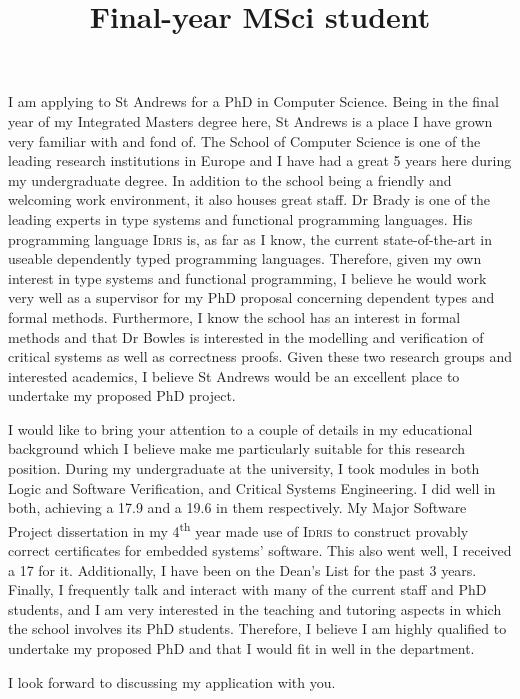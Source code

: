 \documentclass[colorlinks,11pt]{moderncv}
\title{Final-year MSci student}
\date{}
\begin{document}
    
    \vspace*{-1cm}
    
    \makelettertitle
    
    
    I am applying to St Andrews for a PhD in Computer Science. Being in the
    final year of my Integrated Masters degree here, St Andrews is a place I
    have grown very familiar with and fond of. The School of Computer Science is
    one of the leading research institutions in Europe and I have had a great 5
    years here during my undergraduate degree. In addition to the school being a
    friendly and welcoming work environment, it also houses great staff. Dr
    Brady is one of the leading experts in type systems and functional
    programming languages. His programming language \textsc{Idris} is, as far as
    I know, the current state-of-the-art in useable dependently typed
    programming languages. Therefore, given my own interest in type systems and
    functional programming, I believe he would work very well as a supervisor
    for my PhD proposal concerning dependent types and formal methods.
    Furthermore, I know the school has an interest in formal methods and that Dr
    Bowles is interested in the modelling and verification of critical systems
    as well as correctness proofs. Given these two research groups and
    interested academics, I believe St Andrews would be an excellent place to
    undertake my proposed PhD project.
    
    I would like to bring your attention to a couple of details in my
    educational background which I believe make me particularly suitable for
    this research position. During my undergraduate at the university, I took
    modules in both Logic and Software Verification, and Critical Systems
    Engineering. I did well in both, achieving a 17.9 and a 19.6 in them
    respectively. My Major Software Project dissertation in my
    4\textsuperscript{th} year made use of \textsc{Idris} to construct provably
    correct certificates for embedded systems' software. This also went well, I
    received a 17 for it. Additionally, I have been on the Dean's List for the
    past 3 years. Finally, I frequently talk and interact with many of the
    current staff and PhD students, and I am very interested in the teaching and
    tutoring aspects in which the school involves its PhD students. Therefore, I
    believe I am highly qualified to undertake my proposed PhD and that I would
    fit in well in the department.
    
    I look forward to discussing my application with you.
    
    \makeletterclosing
\end{document}
